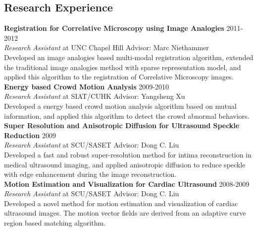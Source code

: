 \documentclass[line,margin]{res}
\begin{document}
\begin{resume}
 
\section{\sc Research Experience} 
\smallskip

\textbf{Registration for Correlative Microscopy using Image Analogies} \hfill      2011-2012 \\
\textit{ Research Assistant} at UNC Chapel Hill  \hfill {Advisor: Marc Niethammer}\\
Developed an image analogies based multi-modal registration algorithm, extended the traditional image analogies method with sparse representation model, and applied this algorithm to the registration of Correlative Microscopy images.
\smallskip \\
\textbf{Energy based Crowd Motion Analysis} \hfill      2009-2010 \\
\textit{Research Assistant} at SIAT/CUHK \hfill {Advisor: Yangsheng Xu}\\
Developed a energy based crowd motion analysis algorithm based on mutual information, and
applied this algorithm to detect the crowd abnormal behaviors.
\smallskip \\
\textbf{Super Resolution and Anisotropic Diffusion for Ultrasound Speckle Reduction} \hfill      2009 \\
\textit{Research Assistant} at SCU/SASET \hfill {Advisor: Dong C. Liu}\\
Developed a fast and robust super-resolution method for intima reconstruction in medical
ultrasound imaging, and applied anisotropic diffusion to reduce speckle with edge enhancement during the image reconstruction.
\smallskip \\
\textbf{Motion Estimation and Visualization for Cardiac Ultrasound} \hfill      2008-2009 \\
\textit{Research Assistant} at SCU/SASET \hfill {Advisor: Dong C. Liu}\\
Developed a novel method for motion estimation and visualization of cardiac ultrasound images. The motion vector fields are derived from an adaptive curve region based matching algorithm.


\end{resume}
\end{document}
